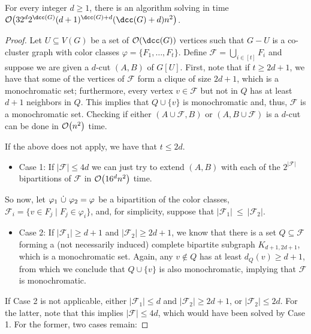 \begin{theorem}
    \label{thm:fpt_cocluster}
    For every integer $d \geq 1$, there is an algorithm solving  in time $\bigO{32^d2^{\dcc(G)}(d+1)^{\dcc(G)+d}(\dcc(G)+d)n^2}$.
\end{theorem}

\begin{proof}
    Let $U \subseteq V(G)$ be a set of $\bigO{\dcc(G)}$ vertices such that $G - U$ is a co-cluster graph with color classes $\varphi = \{F_1, \dots, F_t\}$.
    Define $\mathcal{F} = \bigcup_{i \in [t]} F_i$ and suppose we are given a $d$-cut $(A,B)$ of $G[U]$.
    First, note that if $t \geq 2d+1$, we have that some of the vertices of $\mathcal{F}$ form a clique of size $2d+1$, which is a monochromatic set; furthermore, every vertex $v \in \mathcal{F}$ but not in $Q$ has at least $d+1$ neighbors in $Q$.
    This implies that $Q \cup \{v\}$ is monochromatic and, thus, $\mathcal{F}$ is a monochromatic set.
    Checking if either $(A \cup \mathcal{F}, B)$ or $(A, B \cup \mathcal{F})$ is a $d$-cut can be done in $\mathcal{O}\!\left(n^2\right)$ time.

    If the above does not apply, we have that $t \leq 2d$.
    \begin{itemize}
        \item Case 1: If $|\mathcal{F}| \leq 4d$ we can just try to extend $(A,B)$ with each of the $2^{|\mathcal{F}|}$ bipartitions of $\mathcal{F}$ in $\mathcal{O}\!\left(16^dn^2\right)$ time.
    \end{itemize}

    So now, let $\varphi_1 \ \dot\cup\  \varphi_2 = \varphi$ be a bipartition of the color classes, $\mathcal{F}_i = \{v \in F_j \mid F_j \in \varphi_i\}$, and, for simplicity, suppose that $|\mathcal{F}_1|~\leq~|\mathcal{F}_2|$.

    \begin{itemize}
        \item Case 2: If $|\mathcal{F}_1| \geq d+1$ and $|\mathcal{F}_2| \geq 2d+1$, we know that there is a set $Q \subseteq \mathcal{F}$ forming a (not necessarily induced) complete bipartite subgraph $K_{d+1, 2d+1}$, which is a monochromatic set.
        Again, any $v \notin Q$ has at least $d_Q(v) \geq d+1$, from which we conclude that $Q \cup \{v\}$ is also monochromatic, implying that $\mathcal{F}$ is monochromatic.
    \end{itemize}


    If Case 2 is not applicable, either $|\mathcal{F}_1| \leq d$ and $|\mathcal{F}_2| \geq 2d+1$, or $|\mathcal{F}_2| \leq 2d$.
    For the latter, note that this implies $|\mathcal{F}| \leq 4d$, which would have been solved by Case 1.
    For the former, two cases remain:


\end{proof}
